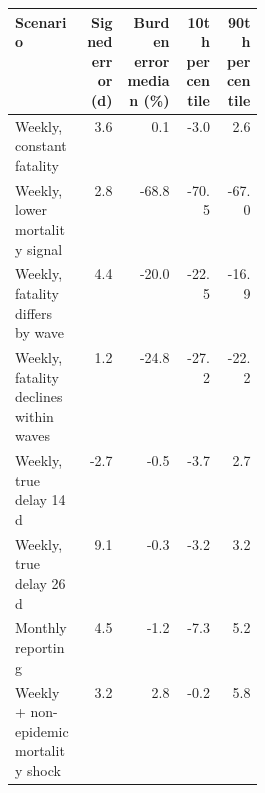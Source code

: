 \begin{tabular}{p{0.29\linewidth}rrrr}
\toprule
Scenario & Signed error (d) & Burden error median (\%) & 10th percentile & 90th percentile \\
\midrule
Weekly, constant fatality & 3.6 & 0.1 & -3.0 & 2.6 \\
Weekly, lower mortality signal & 2.8 & -68.8 & -70.5 & -67.0 \\
Weekly, fatality differs by wave & 4.4 & -20.0 & -22.5 & -16.9 \\
Weekly, fatality declines within waves & 1.2 & -24.8 & -27.2 & -22.2 \\
Weekly, true delay 14 d & -2.7 & -0.5 & -3.7 & 2.7 \\
Weekly, true delay 26 d & 9.1 & -0.3 & -3.2 & 3.2 \\
Monthly reporting & 4.5 & -1.2 & -7.3 & 5.2 \\
Weekly + non-epidemic mortality shock & 3.2 & 2.8 & -0.2 & 5.8 \\
\bottomrule
\end{tabular}
